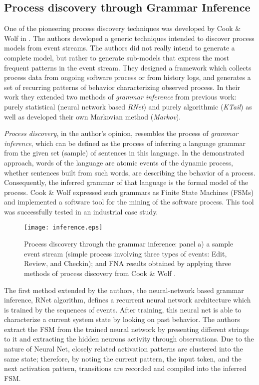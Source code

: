\subsection{Process discovery through Grammar Inference} \label{grammar}
One of the pioneering process discovery techniques was developed by Cook \& Wolf in \cite{citeulike:328044}. The authors 
developed a generic techniques intended to discover process models from event streams. The authors did not really intend to 
generate a complete model, but rather to generate sub-models that express the most frequent patterns in the event stream.
They designed a framework which collects process data from ongoing software process or from history logs, and generates a 
set of recurring patterns of behavior characterizing observed process. In their work they extended two methods of 
\textit{grammar inference} from previous work: purely statistical (neural network based \textit{RNet}) and purely algorithmic 
(\textit{KTail}) as well as developed their own Markovian method (\textit{Markov}). 

\textit{Process discovery}, in the author's opinion, resembles the process of \textit{grammar inference}, which can be defined 
as the process of inferring a language grammar from the given set (sample) of sentences in this language. 
In the demonstrated approach, words of the language are atomic events of the dynamic process, whether sentences built from 
such words, are describing the behavior of a process. 
Consequently, the inferred grammar of that language is the formal model of the process. Cook \& Wolf expressed such grammars 
as Finite State Machines (FSMs) and implemented a software tool for the mining of the software process. 
This tool was successfully tested in an industrial case study.

\begin{figure}[tbp]
   \centering
   \texttt{[image: inference.eps]}
   \caption{Process discovery through the grammar inference: panel a) a sample event stream (simple process involving three 
   types of events: Edit, Review, and Checkin); and FNA results obtained by applying three methods of process discovery from 
   Cook \& Wolf \cite{citeulike:328044}.}
   \label{fig:inference}
\end{figure}

The first method extended by the authors, the neural-network based grammar inference, RNet algorithm, defines a recurrent 
neural network architecture which is trained by the sequences of events. After training, this neural net is able to characterize a 
current system state by looking on past behavior. The authors extract the FSM from the trained neural network by presenting 
different strings to it and extracting the hidden neurons activity through observations. Due to the nature of Neural Net, closely 
related activation patterns are clustered into the same state; therefore, by noting the current pattern, the input token, and the 
next activation pattern, transitions are recorded and compiled into the inferred FSM.

